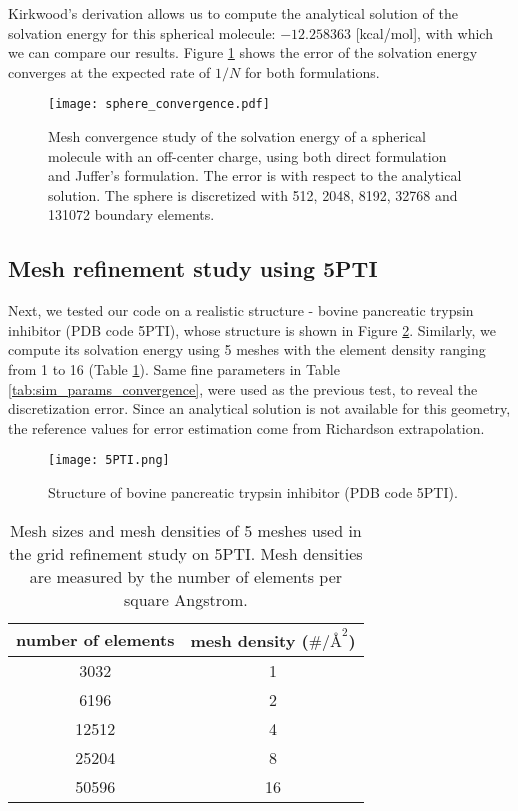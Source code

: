 Kirkwood's derivation allows us to compute the analytical solution of the solvation energy for this spherical molecule: $-12.258363$ [kcal/mol],
with which we can compare our results. Figure \ref{fig:sphere_convergence} shows the error of the solvation energy converges at the expected rate of $1/N$ for both formulations.

\begin{figure}[htbp]
    \centering
    \texttt{[image: sphere\_convergence.pdf]} 
    \caption{Mesh convergence study of the solvation energy of a spherical molecule with an off-center charge, using both direct formulation and Juffer's formulation. The error is with respect to the analytical solution. 
    The sphere is discretized with 512, 2048, 8192, 32768 and 131072 boundary elements.}
    \label{fig:sphere_convergence}
\end{figure}

\subsection{Mesh refinement study using 5PTI}

Next, we tested our code on a realistic structure - bovine pancreatic trypsin inhibitor (PDB code 5PTI), whose structure is shown in Figure \ref{fig:5PTI_structure}.
Similarly, we compute its solvation energy using 5 meshes with the element density ranging from 1 to 16 (Table \ref{tab:5PTI_mesh}).
Same fine parameters in Table \ref{tab:sim_params_convergence}, were used as the previous test, to reveal the discretization error.
Since an analytical solution is not available for this geometry, the reference values for error estimation come from Richardson extrapolation.

\begin{figure}[htbp]
    \centering
    \texttt{[image: 5PTI.png]}
    \caption{Structure of bovine pancreatic trypsin inhibitor (PDB code 5PTI).}
    \label{fig:5PTI_structure}
\end{figure}

\begin{table}[]
    \centering
    \begin{tabular}{cc}
    number of elements & mesh density ($\#/{\si{\angstrom}}^2$) \\
    \hline
    3032               & 1                                       \\
    6196               & 2                                       \\
    12512              & 4                                       \\
    25204              & 8                                       \\
    50596              & 16                                     
    \end{tabular}
    \caption{Mesh sizes and mesh densities of 5 meshes used in the grid refinement study on 5PTI. Mesh densities are measured by the number of elements per square Angstrom.}
    \label{tab:5PTI_mesh}
\end{table}

